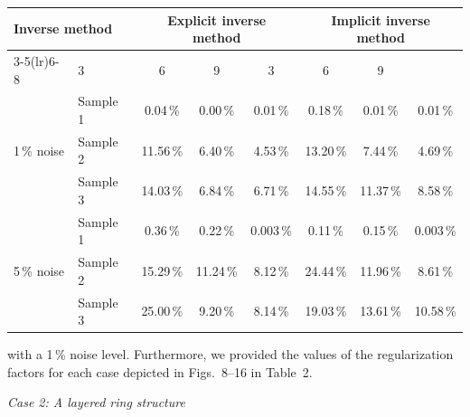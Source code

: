 \documentclass[11pt]{article}
\begin{document}
\begin{center}
\small
\begin{tabular}{@{}ll ccc ccc@{}}
\toprule
\multicolumn{2}{l}{Inverse method}
  & \multicolumn{3}{c}{Explicit inverse method}
  & \multicolumn{3}{c}{Implicit inverse method} \\
\cmidrule(lr){3-5}\cmidrule(lr){6-8}
\multicolumn{2}{l}{Number of surface displacement datasets}
  & 3 & 6 & 9 & 3 & 6 & 9 \\
\midrule
\multirow{3}{*}{1\,\% noise}
  & Sample 1 & 0.04\,\%  & 0.00\,\%  & 0.01\,\%  & 0.18\,\%  & 0.01\,\%  & 0.01\,\%  \\
  & Sample 2 & 11.56\,\% & 6.40\,\%  & 4.53\,\%  & 13.20\,\% & 7.44\,\%  & 4.69\,\%  \\
  & Sample 3 & 14.03\,\% & 6.84\,\%  & 6.71\,\%  & 14.55\,\% & 11.37\,\% & 8.58\,\%  \\
\multirow{3}{*}{5\,\% noise}
  & Sample 1 & 0.36\,\%  & 0.22\,\%  & 0.003\,\% & 0.11\,\%  & 0.15\,\%  & 0.003\,\% \\
  & Sample 2 & 15.29\,\% & 11.24\,\% & 8.12\,\%  & 24.44\,\% & 11.96\,\% & 8.61\,\%  \\
  & Sample 3 & 25.00\,\% & 9.20\,\%  & 8.14\,\%  & 19.03\,\% & 13.61\,\% & 10.58\,\% \\
\bottomrule
\end{tabular}
\end{center}

\vspace{1em}

\noindent
with a 1\,\% noise level. Furthermore, we provided the values of
the regularization factors for each case depicted in Figs.~8--16
in Table~2.

\vspace{0.8em}

\noindent\textit{Case 2: A layered ring structure}

\vspace{0.5em}
\end{document}
